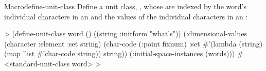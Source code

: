 \documentclass[10pt,twoside,english,pdftex]{article}
\begin{document}
\begin{functiondoc}{Macro}{define-unit-class}
Define a unit class, , whose  are indexed by the
word's individual characters in an  and the
 values of the individual characters in an
:
%
\W\supp
\begin{example}
  > (define-unit-class word ()
      ((string :initform "what's"))
      (:dimensional-values
       (character :element :set string)
       (char-code (:point fixnum) :set 
                  #'(lambda (string)
                      (map 'list #'char-code string))
                  string))
      (:initial-space-instances (words)))
  #<standard-unit-class word>
  >
\end{example}

\end{functiondoc}

\end{document}
